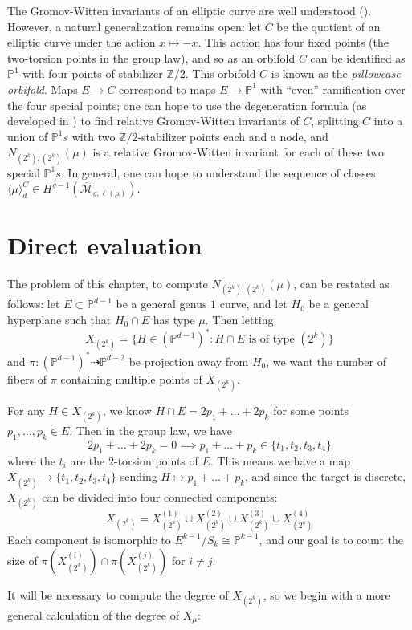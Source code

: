 \documentclass[thesis]{thesis-umich}           %
\newcommand{\Z}{\ensuremath{\mathbb{Z}}}
\renewcommand{\P}{\mathbb P}
\theoremstyle{definition}
\begin{document}
The Gromov-Witten invariants of an elliptic curve are well understood (\cite{Completed}). However, a natural generalization
remains open: let $C$ be the quotient of an elliptic curve under the action $x\mapsto -x$.
This action has four fixed points (the two-torsion points in the group law), and so as an orbifold
$C$ can be identified as $\P^1$ with four points of stabilizer $\Z/2$. This orbifold $C$ is known as the
{\it pillowcase orbifold}. Maps $E\to C$ correspond to maps $E\to\P^1$ with ``even'' ramification over
the four special points; one can hope to use the degeneration formula (as developed in \cite{Degeneration}) to find
relative Gromov-Witten invariants of $C$, splitting $C$ into a union
of $\P^1s$ with two $\Z/2$-stabilizer points each and a node, and $N_{(2^k),(2^k)}(\mu)$ is a relative Gromov-Witten invariant
for each of these two special $\P^1s$.
In general, one can hope to understand the sequence of classes $\langle \mu\rangle_d^{C}\in H^{g-1}(\overline{\mathcal M}_{g,\ell(\mu)})$.

\section{Direct evaluation}
\label{section:direct2}

The problem of this chapter, to compute $N_{(2^k),(2^k)}(\mu)$, can be restated as follows: let $E\subset \P^{d-1}$ be a general genus $1$ curve,
and let $H_0$ be a general hyperplane such that $H_0\cap E$ has type $\mu$. Then letting \[X_{(2^k)}=\{H\in(\P^{d-1})^*:H\cap E\text{ is of type }(2^k)\}\]
and $\pi:(\P^{d-1})^*\dashrightarrow \P^{d-2}$ be projection away from $H_0$, we want the number of fibers of $\pi$
containing multiple points of $X_{(2^k)}$.

For any $H\in X_{(2^k)}$, we know $H\cap E=2p_1+\dots+2p_k$ for some points $p_1,\dots,p_k\in E$. Then in the group law, we have
\[
2p_1+\dots+2p_k=0\implies p_1+\dots+p_k\in\{t_1,t_2,t_3,t_4\}
\]
where the $t_i$ are the $2$-torsion points of $E$. This means we have a map $X_{(2^k)}\to\{t_1,t_2,t_3,t_4\}$ sending $H\mapsto p_1+\dots+p_k$, and since the target is discrete, $X_{(2^k)}$ can be divided into four connected components:
\[
X_{(2^k)}=X_{(2^k)}^{(1)}\cup X_{(2^k)}^{(2)}\cup X_{(2^k)}^{(3)}\cup X_{(2^k)}^{(4)}
\]
Each component is isomorphic to $E^{k-1}/S_k\cong \P^{k-1}$,
and our goal is to count the size of $\pi(X_{(2^k)}^{(i)})\cap \pi(X_{(2^k)}^{(j)})$
for $i\neq j$.

It will be necessary to compute the degree of $X_{(2^k)}$, so we begin with a more general calculation of the degree of $X_{\mu}$:
\end{document}
